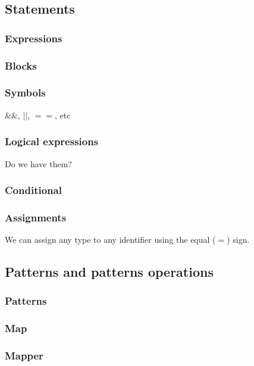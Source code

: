 \documentclass[11pt,twoside]{article}
\begin{document}
\subsection{Statements}

\subsubsection{Expressions}


\subsubsection{Blocks}


\subsubsection{Symbols}
$\&\&$, $||$, $==$, etc


\subsubsection{Logical expressions}
Do we have them?


\subsubsection{Conditional}


\subsubsection{Assignments}
We can assign any type to any identifier using the equal ($=$) sign.


\subsection{Patterns and patterns operations}

\subsubsection{Patterns}

\subsubsection{Map}

\subsubsection{Mapper}
\end{document}
